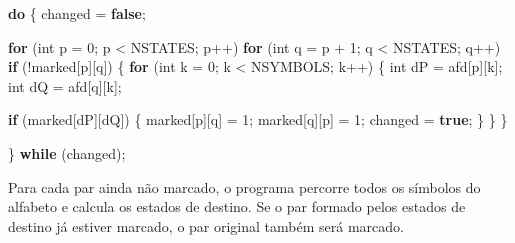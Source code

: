 \documentclass[
  brazilian,
  letterpaper,
]{book}
\newenvironment{Shaded}{\begin{snugshade}}{\end{snugshade}}
\newcommand{\ControlFlowTok}[1]{\textcolor[rgb]{0.00,0.23,0.31}{\textbf{#1}}}
\newcommand{\DataTypeTok}[1]{\textcolor[rgb]{0.68,0.00,0.00}{#1}}
\newcommand{\DecValTok}[1]{\textcolor[rgb]{0.68,0.00,0.00}{#1}}
\newcommand{\KeywordTok}[1]{\textcolor[rgb]{0.00,0.23,0.31}{\textbf{#1}}}
\newcommand{\NormalTok}[1]{\textcolor[rgb]{0.00,0.23,0.31}{#1}}
\newcommand{\OperatorTok}[1]{\textcolor[rgb]{0.37,0.37,0.37}{#1}}
\theoremstyle{plain}
\theoremstyle{definition}
\theoremstyle{remark}
\begin{document}
\begin{Shaded}
\begin{Highlighting}[]
\ControlFlowTok{do}
\OperatorTok{\{}
\NormalTok{    changed }\OperatorTok{=} \KeywordTok{false}\OperatorTok{;}

    \ControlFlowTok{for} \OperatorTok{(}\DataTypeTok{int}\NormalTok{ p }\OperatorTok{=} \DecValTok{0}\OperatorTok{;}\NormalTok{ p }\OperatorTok{\textless{}}\NormalTok{ NSTATES}\OperatorTok{;}\NormalTok{ p}\OperatorTok{++)}
        \ControlFlowTok{for} \OperatorTok{(}\DataTypeTok{int}\NormalTok{ q }\OperatorTok{=}\NormalTok{ p }\OperatorTok{+} \DecValTok{1}\OperatorTok{;}\NormalTok{ q }\OperatorTok{\textless{}}\NormalTok{ NSTATES}\OperatorTok{;}\NormalTok{ q}\OperatorTok{++)}
            \ControlFlowTok{if} \OperatorTok{(!}\NormalTok{marked}\OperatorTok{[}\NormalTok{p}\OperatorTok{][}\NormalTok{q}\OperatorTok{])}
            \OperatorTok{\{}
                \ControlFlowTok{for} \OperatorTok{(}\DataTypeTok{int}\NormalTok{ k }\OperatorTok{=} \DecValTok{0}\OperatorTok{;}\NormalTok{ k }\OperatorTok{\textless{}}\NormalTok{ NSYMBOLS}\OperatorTok{;}\NormalTok{ k}\OperatorTok{++)}
                \OperatorTok{\{}
                    \DataTypeTok{int}\NormalTok{ dP }\OperatorTok{=}\NormalTok{ afd}\OperatorTok{[}\NormalTok{p}\OperatorTok{][}\NormalTok{k}\OperatorTok{];}
                    \DataTypeTok{int}\NormalTok{ dQ }\OperatorTok{=}\NormalTok{ afd}\OperatorTok{[}\NormalTok{q}\OperatorTok{][}\NormalTok{k}\OperatorTok{];}

                    \ControlFlowTok{if} \OperatorTok{(}\NormalTok{marked}\OperatorTok{[}\NormalTok{dP}\OperatorTok{][}\NormalTok{dQ}\OperatorTok{])}
                    \OperatorTok{\{}
\NormalTok{                        marked}\OperatorTok{[}\NormalTok{p}\OperatorTok{][}\NormalTok{q}\OperatorTok{]} \OperatorTok{=} \DecValTok{1}\OperatorTok{;}
\NormalTok{                        marked}\OperatorTok{[}\NormalTok{q}\OperatorTok{][}\NormalTok{p}\OperatorTok{]} \OperatorTok{=} \DecValTok{1}\OperatorTok{;}
\NormalTok{                        changed }\OperatorTok{=} \KeywordTok{true}\OperatorTok{;}
                    \OperatorTok{\}}
                \OperatorTok{\}}
            \OperatorTok{\}}

\OperatorTok{\}} \ControlFlowTok{while} \OperatorTok{(}\NormalTok{changed}\OperatorTok{);}
\end{Highlighting}
\end{Shaded}

Para cada par ainda não marcado, o programa percorre todos os símbolos
do alfabeto e calcula os estados de destino. Se o par formado pelos
estados de destino já estiver marcado, o par original também será
marcado.
\end{document}
